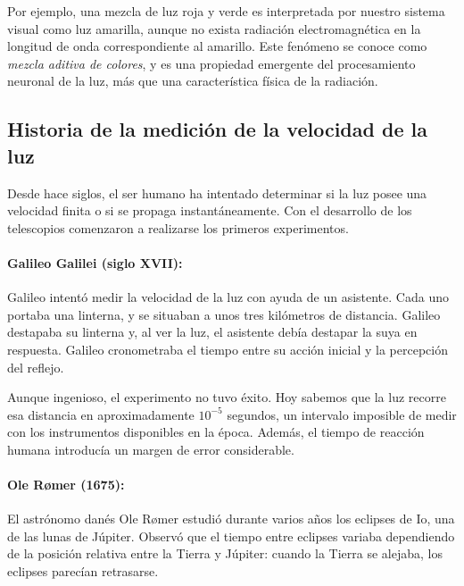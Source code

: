 Por ejemplo, una mezcla de luz roja y verde es interpretada por nuestro sistema visual como luz amarilla, aunque no exista radiación electromagnética en la longitud de onda correspondiente al amarillo. Este fenómeno se conoce como \textit{mezcla aditiva de colores}, y es una propiedad emergente del procesamiento neuronal de la luz, más que una característica física de la radiación.

\vspace{0.3cm}

\subsection*{Historia de la medición de la velocidad de la luz}

Desde hace siglos, el ser humano ha intentado determinar si la luz posee una velocidad finita o si se propaga instantáneamente. Con el desarrollo de los telescopios comenzaron a realizarse los primeros experimentos.

\paragraph{Galileo Galilei (siglo XVII):} Galileo intentó medir la velocidad de la luz con ayuda de un asistente. Cada uno portaba una linterna, y se situaban a unos tres kilómetros de distancia. Galileo destapaba su linterna y, al ver la luz, el asistente debía destapar la suya en respuesta. Galileo cronometraba el tiempo entre su acción inicial y la percepción del reflejo.

Aunque ingenioso, el experimento no tuvo éxito. Hoy sabemos que la luz recorre esa distancia en aproximadamente $10^{-5}$ segundos, un intervalo imposible de medir con los instrumentos disponibles en la época. Además, el tiempo de reacción humana introducía un margen de error considerable.

\vspace{0.3cm}

\paragraph{Ole Rømer (1675):} El astrónomo danés Ole Rømer estudió durante varios años los eclipses de Io, una de las lunas de Júpiter. Observó que el tiempo entre eclipses variaba dependiendo de la posición relativa entre la Tierra y Júpiter: cuando la Tierra se alejaba, los eclipses parecían retrasarse.

